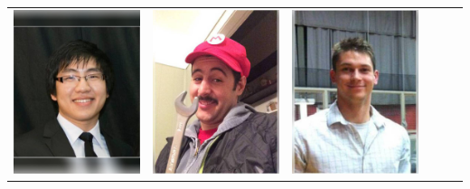 \documentclass[landscape,a0paper,fontscale=0.292]{baposter}
\begin{document}
\begin{poster}
{\begin{center}
\begin{tabularx}{\linewidth}{X X X X X X}
{\centering \includegraphics[width=0.6\linewidth]{hanssusilo.jpg}}&
{\centering \includegraphics[width=0.6\linewidth]{atacchet.jpg}}&
{\centering \includegraphics[width=0.6\linewidth]{wubella.jpg}}&

\end{tabularx}
\end{center}}
\end{poster}
\end{document}

